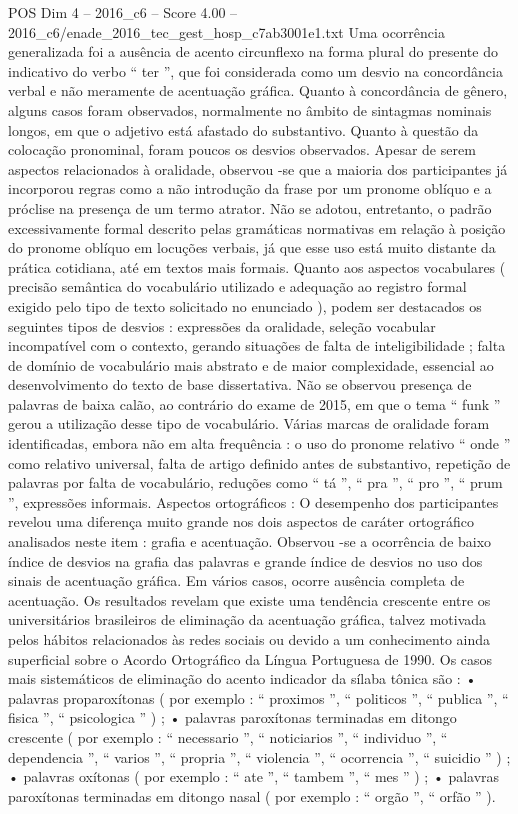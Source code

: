 \begin{textsample}{POS Dim 4 – 2016\_c6 – Score 4.00 – 2016\_c6/enade\_2016\_tec\_gest\_hosp\_c7ab3001e1.txt}
Uma ocorrência generalizada foi a ausência de acento circunflexo na forma plural do presente do indicativo do verbo “ ter ”, que foi considerada como um desvio na concordância verbal e não meramente de acentuação gráfica.
Quanto à concordância de gênero, alguns casos foram observados, normalmente no âmbito de sintagmas nominais longos, em que o adjetivo está afastado do substantivo.
Quanto à questão da colocação pronominal, foram poucos os desvios observados.
Apesar de serem aspectos relacionados à oralidade, observou -se que a maioria dos participantes já incorporou regras como a não introdução da frase por um pronome oblíquo e a próclise na presença de um termo atrator.
Não se adotou, entretanto, o padrão excessivamente formal descrito pelas gramáticas normativas em relação à posição do pronome oblíquo em locuções verbais, já que esse uso está muito distante da prática cotidiana, até em textos mais formais.
Quanto aos aspectos vocabulares ( precisão semântica do vocabulário utilizado e adequação ao registro formal exigido pelo tipo de texto solicitado no enunciado ), podem ser destacados os seguintes tipos de desvios : expressões da oralidade, seleção vocabular incompatível com o contexto, gerando situações de falta de inteligibilidade ; falta de domínio de vocabulário mais abstrato e de maior complexidade, essencial ao desenvolvimento do texto de base dissertativa.
Não se observou presença de palavras de baixa calão, ao contrário do exame de 2015, em que o tema “ funk ” gerou a utilização desse tipo de vocabulário.
Várias marcas de oralidade foram identificadas, embora não em alta frequência : o uso do pronome relativo “ onde ” como relativo universal, falta de artigo definido antes de substantivo, repetição de palavras por falta de vocabulário, reduções como “ tá ”, “ pra ”, “ pro ”, “ prum ”, expressões informais.
Aspectos ortográficos : O desempenho dos participantes revelou uma diferença muito grande nos dois aspectos de caráter ortográfico analisados neste item : grafia e acentuação.
Observou -se a ocorrência de baixo índice de desvios na grafia das palavras e grande índice de desvios no uso dos sinais de acentuação gráfica.
Em vários casos, ocorre ausência completa de acentuação.
Os resultados revelam que existe uma tendência crescente entre os universitários brasileiros de eliminação da acentuação gráfica, talvez motivada pelos hábitos relacionados às redes sociais ou devido a um conhecimento ainda superficial sobre o Acordo Ortográfico da Língua Portuguesa de 1990.
Os casos mais sistemáticos de eliminação do acento indicador da sílaba tônica são : • palavras proparoxítonas ( por exemplo : “ proximos ”, “ politicos ”, “ publica ”, “ fisica ”, “ psicologica ” ) ; • palavras paroxítonas terminadas em ditongo crescente ( por exemplo : “ necessario ”, “ noticiarios ”, “ individuo ”, “ dependencia ”, “ varios ”, “ propria ”, “ violencia ”, “ ocorrencia ”, “ suicidio ” ) ; • palavras oxítonas ( por exemplo : “ ate ”, “ tambem ”, “ mes ” ) ; • palavras paroxítonas terminadas em ditongo nasal ( por exemplo : “ orgão ”, “ orfão ” ).

\end{textsample}

